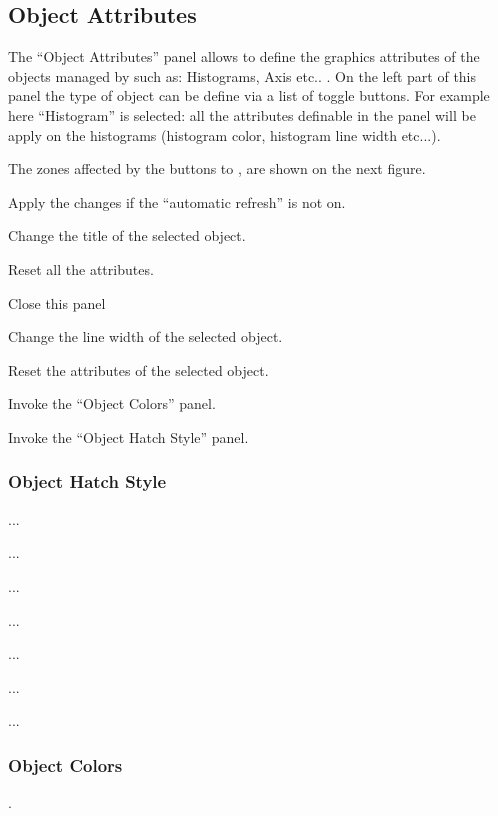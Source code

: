 \newpage

\subsection{Object Attributes}
 
The ``Object Attributes'' panel allows to define the graphics attributes
of the \HPLOT{} objects managed by \XPAW such as: Histograms, Axis etc.. .
On the left part of this panel the type of object can be define via 
a list of toggle buttons. For example here ``Histogram'' is selected: all
the attributes definable in the panel will be apply on the histograms
(histogram color, histogram line width etc...).

The zones affected by the buttons  to , are shown on the
next figure.
\begin{EnumZB}
\item Apply the changes if the ``automatic refresh'' is not on.
\item Change the title of the selected object.
\item Reset all the attributes.
\item Close this panel
\item Change the line width of the selected object.
\item Reset the attributes of the selected object.
\item Invoke the ``Object Colors'' panel.
\item Invoke the ``Object Hatch Style'' panel.
\end{EnumZB}

\subsubsection{Object Hatch Style}

\begin{EnumZW}
\item ...
\item ...
\item ...
\end{EnumZW}
\begin{EnumZB}
\item ...
\item ...
\item ...
\item ...
\end{EnumZB}

\subsubsection{Object Colors}.

